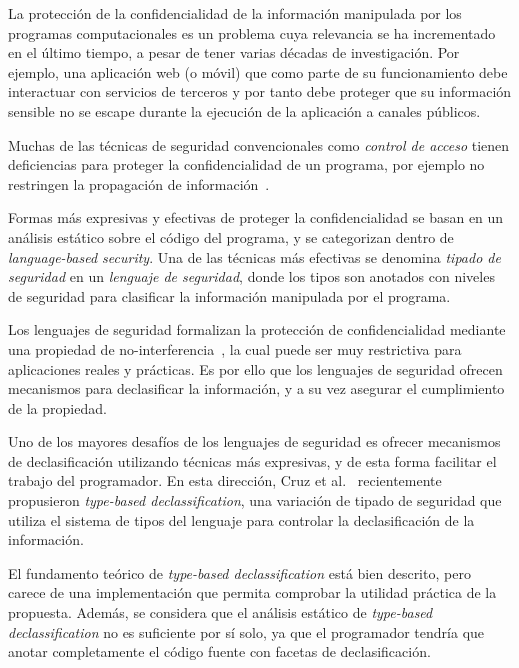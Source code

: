 \begin{intro}

	La protección de la confidencialidad de la información manipulada por los programas computacionales es un problema cuya relevancia se ha incrementado en el último tiempo, a pesar de tener varias décadas de investigación. Por ejemplo, una aplicación web (o móvil) que como parte de su funcionamiento debe interactuar con servicios de terceros y por tanto debe proteger que su información sensible no se escape durante la ejecución de la aplicación a canales públicos.

	Muchas de las técnicas de seguridad convencionales como \textit{control de acceso} tienen deficiencias para proteger la confidencialidad de un programa, por ejemplo no restringen la propagación de información~\cite{myers-phd}.

	Formas más expresivas y efectivas de proteger la confidencialidad se basan en un análisis estático sobre el código del programa, y se categorizan dentro de \textit{language-based security}. Una de las técnicas más efectivas se denomina \textit{tipado de seguridad} en un \textit{lenguaje de seguridad}, donde los tipos son anotados con niveles de seguridad para clasificar la información manipulada por el programa.

	Los lenguajes de seguridad formalizan la protección de confidencialidad mediante una propiedad de no-interferencia~\cite{noninterference}, la cual puede ser muy restrictiva para aplicaciones reales y prácticas. Es por ello que los lenguajes de seguridad ofrecen mecanismos para declasificar la información, y a su vez asegurar el cumplimiento de la propiedad.

	Uno de los mayores desafíos de los lenguajes de seguridad es ofrecer mecanismos de declasificación utilizando técnicas más expresivas, y de esta forma facilitar el trabajo del programador. En esta dirección, Cruz et al.~\cite{cruzAl:ecoop2017} recientemente propusieron \textit{type-based declassification}, una variación de tipado de seguridad que utiliza el sistema de tipos del lenguaje para controlar la declasificación de la información.

	El fundamento teórico de \textit{type-based declassification} está bien descrito, pero carece de una implementación que permita comprobar la utilidad práctica de la propuesta. Además, se considera que el análisis estático de \textit{type-based declassification} no es suficiente por sí solo, ya que el programador tendría que anotar completamente el código fuente con facetas de declasificación.


\end{intro}
